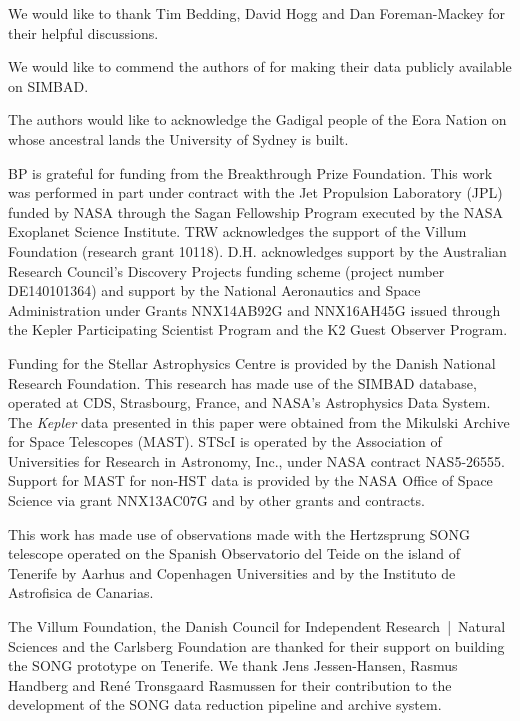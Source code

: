 \documentclass[modern]{aastex61}
\newcommand{\kepler}{\emph{Kepler}\xspace}
\begin{document}
\acknowledgments

We would like to thank Tim Bedding, David Hogg and Dan Foreman-Mackey for their helpful discussions.

We would like to commend the authors of \citet{Hatzes2015} for making their data
publicly available on SIMBAD.

The authors would like to acknowledge the Gadigal people of the Eora Nation on whose ancestral lands the University of Sydney is built.

BP is grateful for funding from the Breakthrough Prize Foundation. This work was performed in part under contract with the Jet Propulsion Laboratory (JPL) funded by NASA through the Sagan Fellowship Program executed by the NASA Exoplanet Science Institute.
TRW acknowledges the support of the Villum Foundation (research grant 10118).
D.H. acknowledges support by the Australian Research Council's Discovery Projects funding scheme (project number DE140101364) and support by the National Aeronautics and Space Administration under Grants NNX14AB92G and NNX16AH45G issued through the Kepler Participating Scientist Program and the K2 Guest Observer Program.

Funding for the Stellar Astrophysics Centre is provided by the Danish National Research Foundation.
This research has made use of the SIMBAD database, operated at CDS, Strasbourg, France, and NASA's Astrophysics Data System. The \kepler data presented in this paper were obtained from the Mikulski Archive for Space Telescopes (MAST). STScI is operated by the Association of Universities for Research in Astronomy, Inc., under NASA contract NAS5-26555. Support for MAST for non-HST data is provided by the NASA Office of Space Science via grant NNX13AC07G and by other grants and contracts.

This work has made use of observations made with the Hertzsprung SONG telescope operated on the Spanish Observatorio
  del Teide on the island of Tenerife by Aarhus and Copenhagen Universities and by the Instituto de
  Astrofisica de Canarias.

The Villum Foundation, the Danish Council for Independent Research~|~Natural Sciences and
 the Carlsberg Foundation are thanked for their support on building the SONG prototype on
 Tenerife.
 We thank Jens Jessen-Hansen, Rasmus Handberg and René Tronsgaard Rasmussen for their contribution
 to the development of the SONG data reduction pipeline and archive system.

\end{document}
